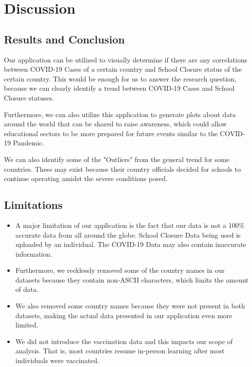 \documentclass[fontsize=11pt]{article}
\begin{document}
    \section{Discussion}

    \subsection{Results and Conclusion}

    Our application can be utilized to visually determine if there are any correlations between COVID-19 Cases of a certain country and School Closure status of the certain country. This would be enough for us to answer the research question, because we can clearly identify a trend between COVID-19 Cases and School Closure statuses.

    Furthermore, we can also utilize this application to generate plots about data around the world that can be shared to raise awareness, which could allow educational sectors to be more prepared for future events similar to the COVID-19 Pandemic.

    We can also identify some of the "Outliers" from the general trend for some countries. These may exist because their country officials decided for schools to continue operating amidst the severe conditions posed.

    \subsection{Limitations}

    \begin{itemize}
        \item A major limitation of our application is the fact that our data is not a 100\% accurate data from all around the globe. School Closure Data being used is uploaded by an individual. The COVID-19 Data may also contain inaccurate information.
        \item Furthermore, we recklessly removed some of the country names in our datasets because they contain non-ASCII characters, which limits the amount of data.
        \item We also removed some country names because they were not present in both datasets, making the actual data presented in our application even more limited.
        \item We did not introduce the vaccination data and this impacts our scope of analysis. That is, most countries resume in-person learning after most individuals were vaccinated.
    \end{itemize}
\end{document}
